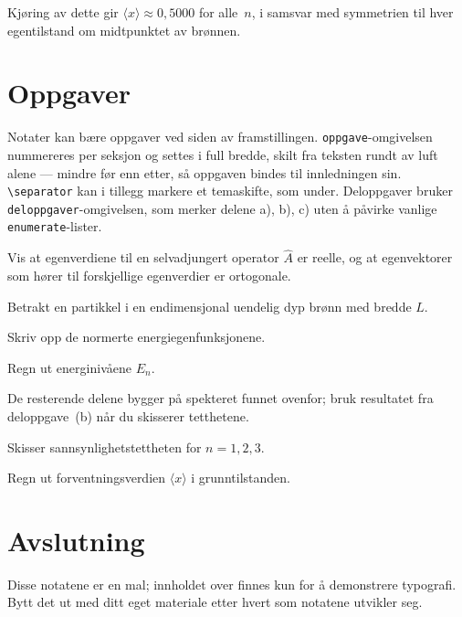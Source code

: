 \documentclass[a4paper,11pt]{article}
\begin{document}
Kjøring av dette gir $\langle x \rangle \approx 0{,}5000$ for
alle~$n$, i samsvar med symmetrien til hver egentilstand om
midtpunktet av brønnen.


\section{Oppgaver}

Notater kan bære oppgaver ved siden av framstillingen.
\verb|oppgave|-omgivelsen nummereres per seksjon og settes i
full bredde, skilt fra teksten rundt av luft alene — mindre
før enn etter, så oppgaven bindes til innledningen sin.
\verb|\separator| kan i tillegg markere et temaskifte, som
under. Deloppgaver bruker \verb|deloppgaver|-omgivelsen, som
merker delene a), b), c) uten å påvirke vanlige
\verb|enumerate|-lister.

\separator

\begin{oppgave}
  Vis at egenverdiene til en selvadjungert operator $\hat{A}$
  er reelle, og at egenvektorer som hører til forskjellige
  egenverdier er ortogonale.
\end{oppgave}

\begin{oppgave}
  Betrakt en partikkel i en endimensjonal uendelig dyp
  brønn med bredde $L$.
  \begin{deloppgaver}
    \item Skriv opp de normerte energiegenfunksjonene.
    \item Regn ut energinivåene $E_n$.
  \end{deloppgaver}

  De resterende delene bygger på spekteret funnet ovenfor; bruk
  resultatet fra deloppgave~(b) når du skisserer tetthetene.

  \begin{deloppgaver}[resume]
    \item Skisser sannsynlighetstettheten for $n = 1, 2, 3$.
    \item Regn ut forventningsverdien $\langle x \rangle$ i
          grunntilstanden.
  \end{deloppgaver}
\end{oppgave}


\section{Avslutning}

Disse notatene er en mal; innholdet over finnes kun for å
demonstrere typografi. Bytt det ut med ditt eget materiale
etter hvert som notatene utvikler seg.




\end{document}

